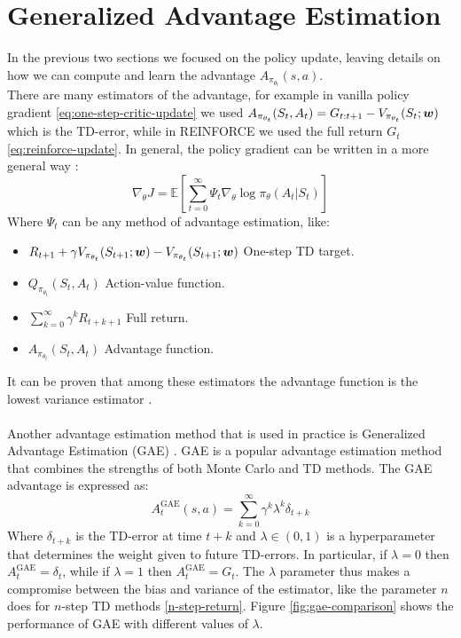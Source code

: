 \section{Generalized Advantage Estimation}
In the previous two sections we focused on the policy update, leaving details on how we can compute and learn the advantage $A_{\pi_{\theta_t}}(s, a)$.\\
There are many estimators of the advantage, for example in vanilla policy gradient \eqref{eq:one-step-critic-update} we used $A_{\pi_{\theta_t}}(S_t, A_t) = G_{t:t+1} - V_{\pi_{\theta_t}}(S_t; \boldsymbol{w})$ which is the TD-error, while in REINFORCE we used the full return $G_t$ \ref{eq:reinforce-update}. In general, the policy gradient can be written in a more general way \cite{schulman2015high}:
\begin{equation}
    \nabla_\theta J = \mathbb{E} \left[ \sum_{t=0}^{\infty} \Psi_t \nabla_\theta \log \pi_{\theta}(A_t|S_t) \right]
\end{equation}
Where $\Psi_t$ can be any method of advantage estimation, like:
\begin{itemize}
    \item $R_{t+1} + \gamma V_{\pi_{\theta_t}}(S_{t+1}; \boldsymbol{w}) - V_{\pi_{\theta_t}}(S_{t+1}; \boldsymbol{w})$ One-step TD target.
    \item $Q_{\pi_{\theta_t}}(S_t, A_t)$ Action-value function.
    \item $\sum_{k=0}^{\infty} \gamma^k R_{t+k+1}$ Full return.
    \item $A_{\pi_{\theta_t}}(S_t, A_t)$ Advantage function.
\end{itemize}
It can be proven that among these estimators the advantage function is the lowest variance estimator \cite{greensmith2004variance}.\\\\
Another advantage estimation method that is used in practice is Generalized Advantage Estimation (GAE) \cite{schulman2015high}. GAE is a popular advantage estimation method that combines the strengths of both Monte Carlo and TD methods. The GAE advantage is expressed as:
\begin{equation}
    A_{t}^{\textrm{GAE}}(s, a) = \sum_{k=0}^{\infty} \gamma^k \lambda^k \delta_{t+k}
    \label{eq:gae-advantage}
\end{equation}
Where $\delta_{t+k}$ is the TD-error at time $t+k$ and $\lambda \in (0, 1)$ is a hyperparameter that determines the weight given to future TD-errors. In particular, if $\lambda = 0$ then $A_t^{\textrm{GAE}} = \delta_t$, while if $\lambda = 1$ then $A_t^{\textrm{GAE}} = G_t$. The $\lambda$ parameter thus makes a compromise between the bias and variance of the estimator, like the parameter $n$ does for $n$-step TD methods \ref{n-step-return}. Figure \ref{fig:gae-comparison} shows the performance of GAE with different values of $\lambda$.\\
